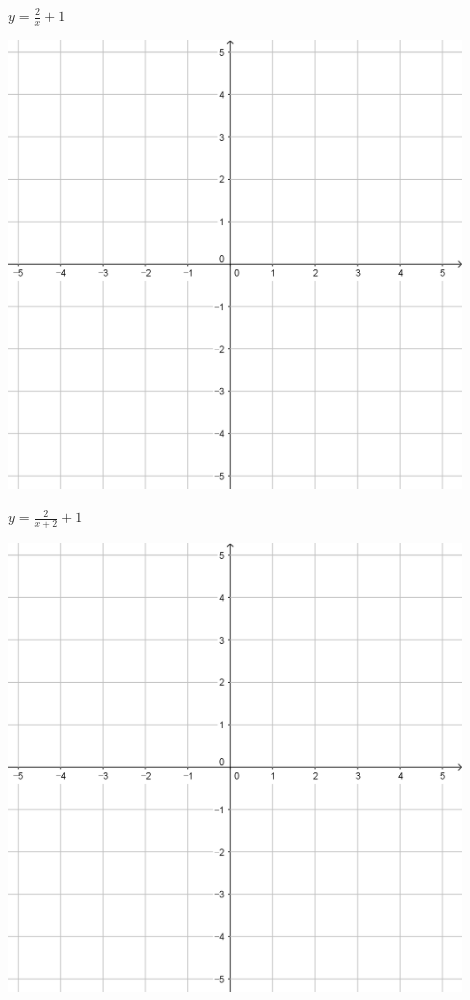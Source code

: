 \documentclass{oblivoir}
\begin{document}
\begin{minipage}{0.45\textwidth}\centering
\(y=\frac2x+1\)
\par\bigskip\includegraphics[width=0.9\textwidth]{55}
\end{minipage}
\begin{minipage}{0.45\textwidth}\centering
\(y=\frac2{x+2}+1\)
\par\bigskip\includegraphics[width=0.9\textwidth]{55}
\end{minipage}\bigskip\bigskip\par
\end{document}

